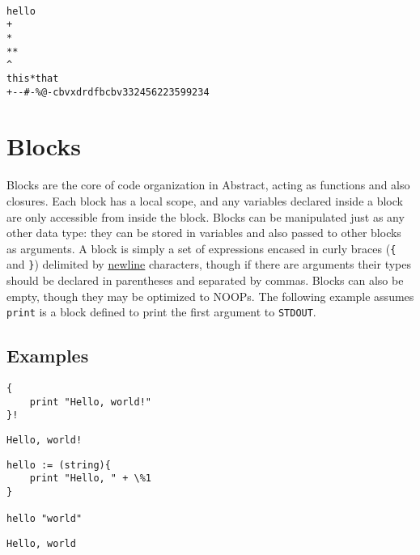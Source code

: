 \documentclass[letterpaper,titlepage]{scrreprt}
\begin{document}
\begin{lstlisting}[caption={Example identifiers},label=lst:identifiers]

hello
+
*
**
^
this*that
+--#-%@-cbvxdrdfbcbv332456223599234

\end{lstlisting}

\section{Blocks}
\label{sec:Blocks}

Blocks are the core of code organization in Abstract, acting as functions and also closures. Each block has a local scope, and any variables declared inside a block are only accessible from inside the block. Blocks can be manipulated just as any other data type: they can be stored in variables and also passed to other blocks as arguments. A block is simply a set of expressions encased in curly braces (\lstinline|{| and \lstinline|}|) delimited by \hyperref[def:newline]{newline} characters, though if there are arguments their types should be declared in parentheses and separated by commas. Blocks can also be empty, though they may be optimized to NOOPs. The following example assumes \lstinline{print} is a block defined to print the first argument to \lstinline{STDOUT}.

\subsection{Examples}
\label{subsec:BlockExamples}

\begin{lstlisting}[caption={Example block},label=lst:exampleblock]
{
	print "Hello, world!"
}!
\end{lstlisting}
\begin{lstlisting}[caption={Example block output},label=lst:exampleblockoutput]
Hello, world!
\end{lstlisting}

\begin{lstlisting}[caption={Example block with arguments},label=lst:exampleblockarg]
hello := (string){
	print "Hello, " + \%1
}

hello "world"
\end{lstlisting}
\begin{lstlisting}[caption={Example block with arguments output},label=lst:exampleblockargoutput]
Hello, world
\end{lstlisting}
\end{document}
